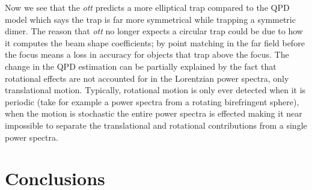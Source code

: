 Now we see that the \textit{ott} predicts a more elliptical 
trap compared to the QPD model which says the trap is far
more symmetrical while trapping a symmetric dimer. The reason that
\textit{ott} no longer expects a circular trap could be due to
how it computes the beam shape coefficients; by point matching in 
the far field before the focus means a loss in accuracy for objects
that trap above the focus. The change in the QPD estimation  
can be partially explained by the fact that rotational
effects are not accounted for in the Lorentzian power spectra,
only translational motion. Typically, rotational motion is only
ever detected when it is periodic (take for example a power spectra
from a rotating birefringent sphere), when the motion is stochastic
the entire power spectra is effected making it near impossible
to separate the translational and rotational contributions from a 
single power spectra. 


\section{Conclusions}
